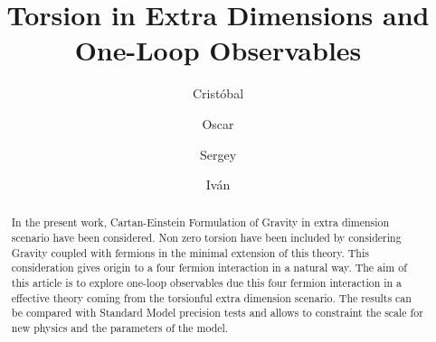 \documentclass[twocolumn,showpacs,showkeys,prd,superscriptaddress]{revtex4-1}
\begin{document}
\title{Torsion in Extra Dimensions and One-Loop Observables}

\author{Crist\'obal }

\author{Oscar }

\author{Sergey }

\author{Iv\'an }

\begin{abstract}
 In the present work, Cartan-Einstein Formulation of Gravity in extra dimension scenario have been considered. Non zero torsion have been included by considering Gravity coupled with fermions in the minimal extension of this theory. This consideration gives origin to a four fermion interaction in a natural way. The aim of this article is to explore one-loop observables due this four fermion interaction in a effective theory coming from the torsionful extra dimension scenario. The results can be compared with Standard Model precision tests and allows to constraint the scale for new physics and the parameters of the model.
\end{abstract}

\maketitle










\appendix





\end{document}
